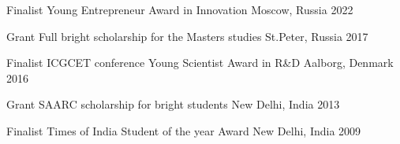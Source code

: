 


\begin{cvhonors}		%

  \cvhonor
    {Finalist} %
    {Young Entrepreneur Award in Innovation } %
    {Moscow, Russia} %
    {2022} %



\cvhonor
	{Grant}
	{Full bright scholarship for the Masters studies}
	{St.Peter, Russia}
	{2017}
	
  \cvhonor
    {Finalist} %
    {ICGCET conference Young Scientist Award in R\&D} %
    {Aalborg, Denmark} %
    {2016} %




\cvhonor
	{Grant}
	{SAARC scholarship for bright students}
	{New Delhi, India}
	{2013}
	
	\cvhonor
	{Finalist}
	{Times of India Student of the year Award}
	{New Delhi, India}
	{2009}
	
	
	
	
	

\end{cvhonors}
